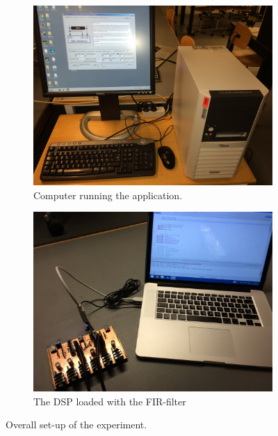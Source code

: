 \begin{figure}[H]
	\centering
	\begin{subfigure}[b]{.495\textwidth}
		\centering
		\includegraphics[width=\textwidth]{../Journal/Experiments/Figures/Fullsetup1}
		\caption{Computer running the application.}
		\label{fig:FIRFullSetup1}
	\end{subfigure} 
	\begin{subfigure}[b]{.495\textwidth}
		\centering
		\includegraphics[width=\textwidth]{../Journal/Experiments/Figures/Fullsetup2}
		\caption{The DSP loaded with the FIR-filter}
		\label{fig:AngOgIndMicplace}
		\label{fig:FIRFullSetup2}
	\end{subfigure}
	\caption{Overall set-up of the experiment.}
		\label{fig:FIRFullSetup}
\end{figure}


